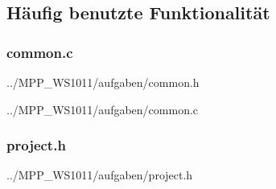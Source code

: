 \subsection{Häufig benutzte Funktionalität}

\subsubsection*{common.c}

{../MPP_WS1011/aufgaben/common.h}

{../MPP_WS1011/aufgaben/common.c}

\subsubsection*{project.h}

{../MPP_WS1011/aufgaben/project.h}
